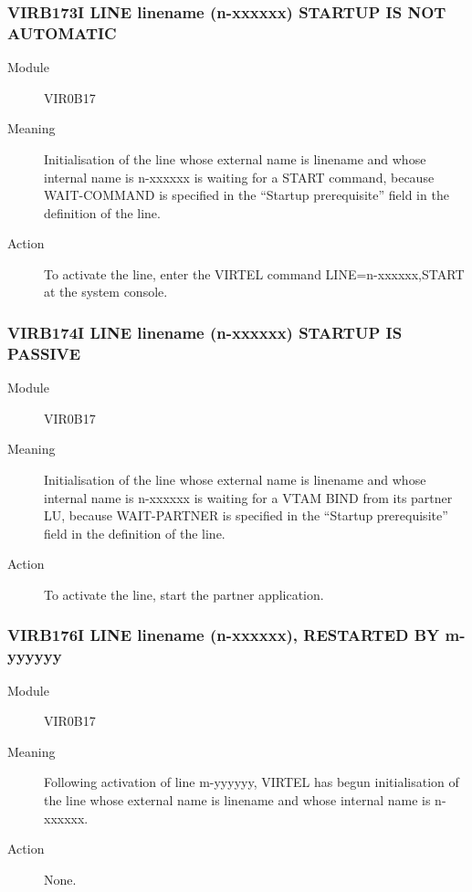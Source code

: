 \documentclass[letterpaper,10pt,english]{sphinxmanual}
\begin{document}
\subsubsection{VIRB173I LINE linename (n-xxxxxx) STARTUP IS NOT AUTOMATIC}
\label{\detokenize{messages:virb173i-line-linename-n-xxxxxx-startup-is-not-automatic}}\begin{description}
\item[{Module}] \leavevmode
VIR0B17

\item[{Meaning}] \leavevmode
Initialisation of the line whose external name is linename and whose internal name is n-xxxxxx is waiting for a START command, because WAIT-COMMAND is specified in the “Startup prerequisite” field in the definition of the line.

\item[{Action}] \leavevmode
To activate the line, enter the VIRTEL command LINE=n-xxxxxx,START at the system console.

\end{description}


\subsubsection{VIRB174I LINE linename (n-xxxxxx) STARTUP IS PASSIVE}
\label{\detokenize{messages:virb174i-line-linename-n-xxxxxx-startup-is-passive}}\begin{description}
\item[{Module}] \leavevmode
VIR0B17

\item[{Meaning}] \leavevmode
Initialisation of the line whose external name is linename and whose internal name is n-xxxxxx is waiting for a VTAM BIND from its partner LU, because WAIT-PARTNER is specified in the “Startup prerequisite” field in the definition of the line.

\item[{Action}] \leavevmode
To activate the line, start the partner application.

\end{description}


\subsubsection{VIRB176I LINE linename (n-xxxxxx), RESTARTED BY m-yyyyyy}
\label{\detokenize{messages:virb176i-line-linename-n-xxxxxx-restarted-by-m-yyyyyy}}\begin{description}
\item[{Module}] \leavevmode
VIR0B17

\item[{Meaning}] \leavevmode
Following activation of line m-yyyyyy, VIRTEL has begun initialisation of the line whose external name is linename and whose internal name is n-xxxxxx.

\item[{Action}] \leavevmode
None.

\end{description}
\end{document}
